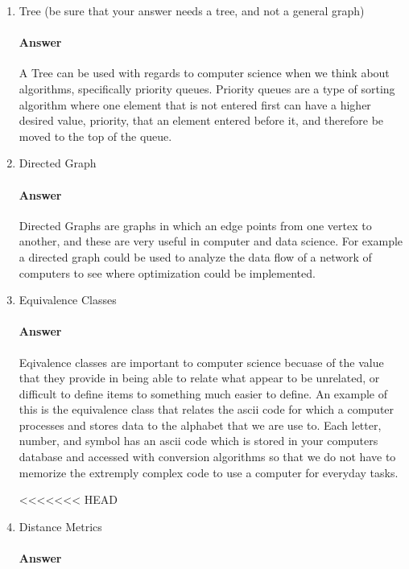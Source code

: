 \documentclass{article}
\begin{document}
\begin{enumerate}

    \item Tree (be sure that your answer needs a tree, and not a general graph)

        \paragraph{Answer}

       A Tree can be used with regards to computer science when we think about algorithms, specifically priority queues. Priority queues are a type of sorting algorithm where one element that is not entered first can have a higher desired value, priority, that an element entered before it, and therefore be moved to the top of the queue.

    \item Directed Graph

        \paragraph{Answer}

       Directed Graphs are graphs in which an edge points from one vertex to another, and these are very useful in computer and data science. For example a directed graph could be used to analyze the data flow of a network of computers to see where optimization could be implemented. 
    \item Equivalence Classes

        \paragraph{Answer}

        Eqivalence classes are important to computer science becuase of the value that they provide in being able to relate what appear to be unrelated, or difficult to define items to something much easier to define. An example of this is the equivalence class that relates the ascii code for which a computer processes and stores data to the alphabet that we are use to. Each letter, number, and symbol has an ascii code which is stored in your computers database and accessed with conversion algorithms so that we do not have to memorize the extremply complex code to use a computer for everyday tasks.

<<<<<<< HEAD
    \item Distance Metrics

        \paragraph{Answer}


\end{enumerate}
\end{document}
